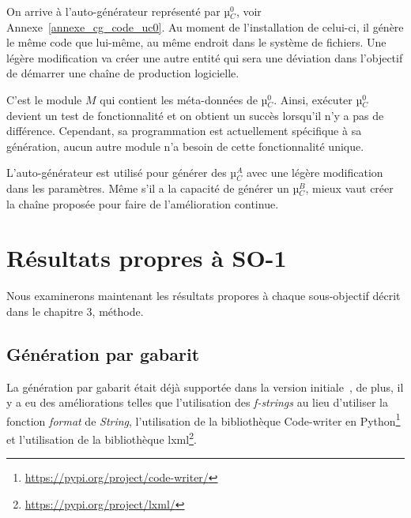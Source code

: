 On arrive à l'auto-générateur représenté par µ$_C^0$, voir Annexe~\ref{annexe_cg_code_uc0}. Au moment de l'installation de celui-ci, il génère le même code que lui-même, au même endroit dans le système de fichiers. Une légère modification va créer une autre entité qui sera une déviation dans l’objectif de démarrer une chaîne de production logicielle.

C'est le module $M$ qui contient les méta-données de µ$_C^0$. Ainsi, exécuter µ$_C^0$ devient un test de fonctionnalité et on obtient un succès lorsqu'il n'y a pas de différence. Cependant, sa programmation est actuellement spécifique à sa génération, aucun autre module n’a besoin de cette fonctionnalité unique.




L'auto-générateur est utilisé pour générer des µ$_C^A$ avec une légère modification dans les paramètres. Même s'il a la capacité de générer un µ$_C^B$, mieux vaut créer la chaîne proposée pour faire de l'amélioration continue.

\section{Résultats propres à SO-1}
Nous examinerons maintenant les résultats propores à chaque sous-objectif décrit dans le chapitre 3, méthode.
\subsection{Génération par gabarit}

La génération par gabarit était déjà supportée dans la version initiale~\cite{bluiksnot_repo}, de plus, il y a eu des améliorations telles que l'utilisation des \textit{f-strings} au lieu d'utiliser la fonction \textit{format} de \textit{String}, l'utilisation de la bibliothèque Code-writer en Python\footnote{\url{https://pypi.org/project/code-writer/}} et l'utilisation de la bibliothèque lxml\footnote{\url{https://pypi.org/project/lxml/}}.

